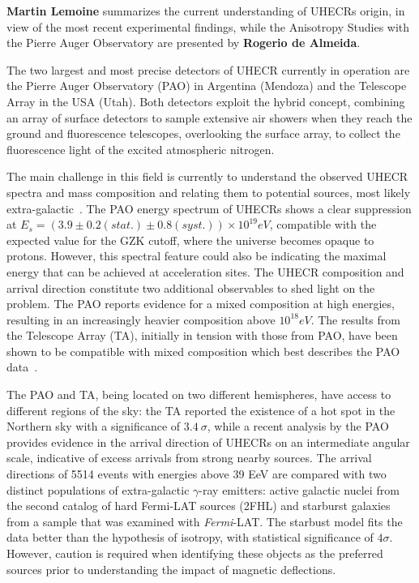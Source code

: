 \documentclass{PoS}
\begin{document}
{\bf Martin Lemoine} summarizes the current understanding of UHECRs origin, in view of the most recent experimental findings, while the Anisotropy Studies with the Pierre Auger Observatory are presented by {\bf Rogerio de Almeida}.

The two largest and most precise detectors of UHECR currently in operation are the
Pierre Auger Observatory (PAO) in Argentina (Mendoza) and the Telescope Array in the
USA (Utah). Both detectors exploit the hybrid concept, combining an array of
surface detectors to sample extensive air showers when they reach the ground and
fluorescence telescopes, overlooking the surface array, to collect the fluorescence light of the excited atmospheric nitrogen. 

The main challenge in this field is currently to understand the observed UHECR spectra and mass composition and relating them to potential sources, most likely extra-galactic~\cite{Aloisio}. 
The PAO energy spectrum of UHECRs shows a clear suppression at $E_{s} = (3.9 \pm 0.2(stat.) \pm
0.8(syst.)) \times 10^{19} eV$, compatible with the expected value for the GZK cutoff, where the universe becomes opaque to protons. However, this spectral feature could also be indicating the maximal energy that can be achieved at acceleration sites. 
The UHECR composition and arrival direction constitute two additional observables to shed light on the problem. The PAO reports evidence for a mixed composition at high energies, resulting in an increasingly heavier composition above $10^{18} eV$. The results from the Telescope Array (TA), initially in tension with those from PAO, have been shown to be compatible with mixed composition which best describes the PAO data~\cite{vitor}. 

The PAO and TA, being located on two different hemispheres, have access to different regions of the sky: the TA reported the existence of a hot spot in the Northern sky with a significance of $3.4~\sigma$, while 
a recent analysis by the PAO~\cite{Aab:2018chp} provides evidence in the arrival direction of
UHECRs on an intermediate angular scale, indicative of excess arrivals from strong nearby sources. 
The arrival directions of 5514 events with energies above 39 EeV are compared
with two distinct populations of extra-galactic $\gamma$-ray emitters: active galactic nuclei from the second catalog of hard Fermi-LAT sources (2FHL) and starburst galaxies from a sample that was examined with \textit{Fermi}-LAT. The starbust model fits the data better than the hypothesis of isotropy, with statistical significance of $4\sigma$. However, caution is required when identifying these objects as the preferred 
sources prior to understanding the impact of magnetic deflections. 
\end{document}
